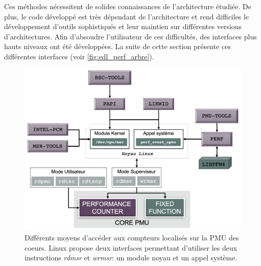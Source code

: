        Ces méthodes nécessitent de solides connaissances de l'architecture étudiée. De plus, le code développé est très dépendant de l'architecture et rend difficiles le développement d'outils sophistiqués et leur maintien sur différentes versions d'architectures. Afin d'absoudre l'utilisateur de ces difficultés, des interfaces plus hauts niveaux ont été développées. La suite de cette section présente ces différentes interfaces (voir \autoref{fig:edl_perf_arbre}).
            
            \begin{figure}[h]
            \center
            \includegraphics[width=14cm]{images/edl_perf_arbre.png}
            \caption{\label{fig:edl_perf_arbre} Différents moyens d'accéder aux compteurs localisés sur la PMU des coeurs. Linux propose deux interfaces permettant d'utiliser les deux instructions \textit{rdmsr} et \textit{wrmsr}: un module noyau et un appel système.}
            \end{figure}
           
